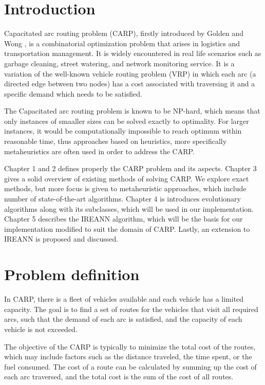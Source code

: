 \documentclass[oneside]{ctuthesis}
\theoremstyle{plain}
\theoremstyle{definition}
\theoremstyle{note}
\begin{document}
\chapter{Introduction}
Capacitated arc routing problem (CARP), firstly introduced by Golden and Wong \cite{golden1981capacitated}, is a combinatorial optimization problem that arises in logistics and transportation management. It is widely encountered in real life scenarios such as garbage cleaning, street watering, and network monitoring service. It is a variation of the well-known vehicle routing problem (VRP) in which each arc (a directed edge between two nodes) has a cost associated with traversing it and a specific demand which needs to be satisfied.

The Capacitated arc routing problem is known to be NP-hard, which means that only instances of smaaller sizes can be solved exactly to optimality. For larger instances, it would be computationally impossible to reach optimum within reasonable time, thus approaches based on heuristics, more specifically metaheuristics are often used in order to address the CARP.

Chapter 1 and 2 defines properly the CARP problem and its aspects. Chapter 3 gives a solid overview of existing methods of solving CARP. We explore exact methods, but more focus is given to metaheuristic approaches, which include number of state-of-the-art algorithms. 
Chapter 4 is introduces evolutionary algorithms along with its subclasses, which will be used in our implementation.
Chapter 5 describes the IREANN algorithm, which will be the basis for our implementation modified to suit the domain of CARP. Lastly, an extension to IREANN is proposed and discussed.

\chapter{Problem definition}
In CARP, there is a fleet of vehicles available and each vehicle has a limited capacity. The goal is to find a set of routes for the vehicles that visit all required arcs, such that the demand of each arc is satisfied, and the capacity of each vehicle is not exceeded.

The objective of the CARP is typically to minimize the total cost of the routes, which may include factors such as the distance traveled, the time spent, or the fuel consumed. The cost of a route can be calculated by summing up the cost of each arc traversed, and the total cost is the sum of the cost of all routes.
\end{document}
